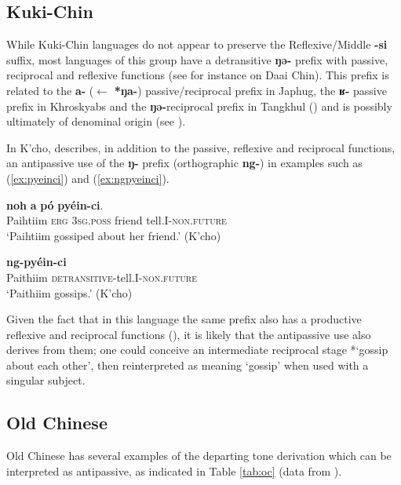 \documentclass[oneside,a4paper,11pt]{article}
\newcommand{\ipa}[1]{{\phon\textbf{#1}}}
\begin{document}
 \subsection{Kuki-Chin} \label{sec:kc}
While Kuki-Chin languages do not appear to preserve the Reflexive/Middle \ipa{-si} suffix, most languages of this group have a detransitive \ipa{ŋə-} prefix with passive, reciprocal and reflexive functions (see for instance \citealt[203-209]{hartmann09grammar} on Daai Chin). This prefix is related to the \ipa{a-} ($\leftarrow$ \ipa{*ŋa-}) passive/reciprocal prefix in Japhug, the \ipa{ʁ-} passive prefix in Khroskyabs and the \ipa{ŋə-}reciprocal prefix in Tangkhul (\citealt[904-5]{jacques07passif}) and is possibly ultimately  of denominal origin (see \citealt{lai18denom}).

In K'cho, \citet[57]{mang06kcho} describes, in addition to the passive, reflexive and reciprocal functions, an antipassive use of the \ipa{ŋ-} prefix (orthographic \ipa{ng-}) in examples such as (\ref{ex:pyeinci}) and (\ref{ex:ngpyeinci}).

\begin{exe}
\ex  \label{ex:pyeinci}
\gll  \ipa{Páihtiim} \ipa{noh} \ipa{a} \ipa{pó} \ipa{pyéin-ci}. \\
Paihtiim \textsc{erg} \textsc{3sg.poss} friend tell.I-\textsc{non.future} \\
\glt `Paihtiim gossiped about her friend.' (K'cho)
\end{exe}

\begin{exe}
\ex  \label{ex:ngpyeinci}
\gll  \ipa{Páithiim} \ipa{ng-pyéin-ci} \\
Paithiim \textsc{detransitive}-tell.I-\textsc{non.future} \\
\glt `Paithiim gossips.' (K'cho)
\end{exe}

Given the fact that in this language the same prefix also has a productive reflexive and reciprocal functions (\citealt[55-6]{mang06kcho}), it is likely that the antipassive use also derives from them; one could conceive an intermediate reciprocal stage *`gossip about each other', then reinterpreted as meaning `gossip' when used with a singular subject.

\subsection{Old Chinese} \label{sec:oc}
Old Chinese has several examples of the departing tone derivation which can be interpreted as antipassive, as indicated in Table \ref{tab:oc} (data from \citealt[287-288]{downer59}).
\end{document}
